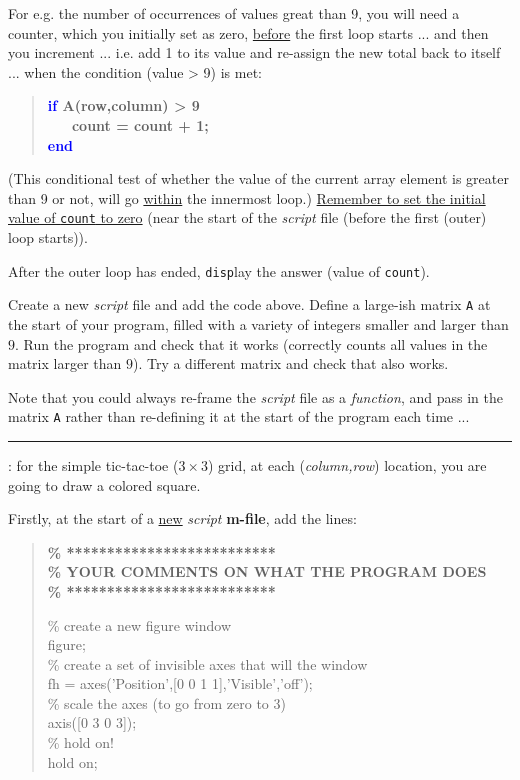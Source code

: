 \documentclass{tufte-book} %
\newenvironment{docspecbold}{\begin{quotation}\ttfamily\bfseries\parskip0pt\parindent0pt\ignorespaces}{\end{quotation}}
\begin{document}
For e.g. the number of occurrences of values great than 9, you will need a counter, which you initially set as zero, \uline{before} the first loop starts ... and then you increment ... i.e. add 1 to its value and re-assign the new total back to itself ... when the condition (value > 9) is met:
\begin{docspecbold}
\textcolor{blue}{if} A(row,column) > 9\\
\ \ \ count = count + 1;\\
\textcolor{blue}{end}
\end{docspecbold}
(This conditional test of whether the value of the current array element is greater than 9 or not, will go \uline{within} the innermost loop.)
 \uline{Remember to set the initial value of \texttt{count} to zero} (near the start of the \textit{script} file (before the first (outer) loop starts)).
 
After the outer loop has ended, \texttt{disp}lay the answer (value of \texttt{count}).

Create a new \textit{script} file and add the code above. Define a large-ish matrix \texttt{A} at the start of your program, filled with a variety of integers smaller and larger than \(9\). Run the program and check that it works (correctly counts all values in the matrix larger than \(9\)). Try a different matrix and check that also works.

Note that you could always re-frame the \textit{script} file as a \textit{function}, and pass in the matrix \texttt{A} rather than re-defining it at the start of the program each time ...

\noindent\rule{4cm}{0.5pt}
\vspace{-2mm}

: for the simple tic-tac-toe (\(3\times3\)) grid, at each (\textit{column,row}) location, you are going to draw a colored square.

\vspace{1mm}
Firstly, at the start of a \uline{new} \textit{script} \textbf{m-file}, add the lines:

\begin{docspecbold}
\textcolor[rgb]{0,0.501961,0}{\% **************************\\
\% YOUR COMMENTS ON WHAT THE PROGRAM DOES\\
\% **************************\\}

\textcolor[rgb]{0,0.501961,0}{\% create a new figure window\\}
figure;\\
\textcolor[rgb]{0,0.501961,0}{\% create a set of invisible axes that will the window\\}
fh = axes(\textcolor[rgb]{1,0,1}{'Position'},[0 0 1 1],\textcolor[rgb]{1,0,1}{'Visible'},\textcolor[rgb]{1,0,1}{'off'});\\
\textcolor[rgb]{0,0.501961,0}{\% scale the axes (to go from zero to 3)\\}
axis([0 3 0 3]);\\
\textcolor[rgb]{0,0.501961,0}{\% hold on!\\}
hold \textcolor[rgb]{1,0,1}{on};
\end{docspecbold}
\end{document}
